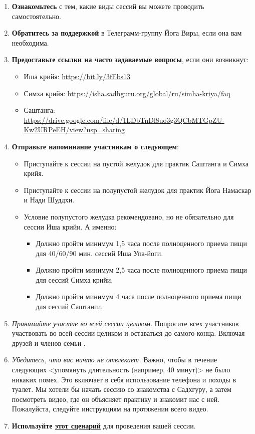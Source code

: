 \begin{enumerate}
    \item \textbf{Ознакомьтесь} с тем, какие виды сессий вы можете проводить самостоятельно.
    \item \textbf{Обратитесь за поддержкой} в Телеграмм-группу Йога Виры, если она вам
необходима.
\item \textbf{Предоставьте ссылки на часто задаваемые вопросы}, если они возникнут:
\begin{itemize}
    \item Иша крийя: \href{https://bit.ly/3fEbs13}{\tiny https://bit.ly/3fEbs13}
    \item Симха крийя: \href{https://isha.sadhguru.org/global/ru/simha-kriya/faq}{\tiny https://isha.sadhguru.org/global/ru/simha-kriya/faq}
    \item Саштанга: \href{https://drive.google.com/file/d/1LDbTnDl8uo3g3QCbMTGpZU-Kw2URPeEH/view?usp=sharing}{\tiny https://drive.google.com/file/d/1LDbTnDl8uo3g3QCbMTGpZU-Kw2URPeEH/view?usp=sharing}
\end{itemize}
\item \textbf{Отправьте напоминание участникам о следующем}:
    \begin{itemize}
    \item Приступайте к сессии на пустой желудок для практик Саштанга и Симха крийя.
    \item Приступайте к сессии на полупустой желудок для практик Йога Намаскар и Нади Шуддхи.
    \item Условие полупустого желудка рекомендовано, но не обязательно для сессии Иша крийи.
    А именно:
    \begin{itemize}
        \item[\faClockO] Должно пройти минимум 1,5 часа после полноценного приема пищи для 40/60/90 мин. сессий Иша Упа-йоги.
        \item[\faClockO] Должно пройти минимум 2,5 часа после полноценного приема пищи для сессий Симха крийи.
        \item[\faClockO] Должно пройти минимум 4 часа после полноценного приема пищи для сессий Саштанги.
    \end{itemize}
    \end{itemize}

\item \emph{Принимайте участие во всей сессии целиком.} Попросите всех участников участвовать во всей сессии целиком и оставаться до самого конца. Включая друзей и членов семьи \faSmileO.
\item \emph{Убедитесь, что вас ничто не отвлекает.} Важно, чтобы в течение следующих <упомянуть длительность (например, 40 минут)> не было никаких
помех. Это включает в себя использование телефона и походы в туалет. Мы
хотели бы начать сессию со знакомства с Садхгуру, а затем посмотреть
видео, где он объясняет практику и знакомит нас с ней. Пожалуйста,
следуйте инструкциям на протяжении всего видео.
\item \textbf{Используйте \href{https://drive.google.com/file/d/19X10ANk28EUXqd9_cOFGla0Y-XeFVKd2/view?usp=sharing}{этот сценарий}} для проведения вашей сессии.

\end{enumerate}

